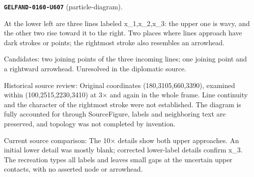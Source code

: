 \par\noindent\leavevmode{}\label{GELFAND-0160-U607}\label{GELFAND-P001483:particle-diagram}\textbf{\texttt{GELFAND-0160-U607}} (particle-diagram).\nopagebreak[4]\par
At the lower left are three lines labeled x\_1,x\_2,x\_3: the upper one is wavy, and the other two rise toward it to the right. Two places where lines approach have dark strokes or points; the rightmost stroke also resembles an arrowhead.\par
Candidates: two joining points of the three incoming lines; one joining point and a rightward arrowhead. Unresolved in the diplomatic source.\par
Historical source review: Original coordinates (180,3105,660,3390), examined within (100,2515,2230,3410) at 3× and again in the whole frame. Line continuity and the character of the rightmost stroke were not established. The diagram is fully accounted for through SourceFigure, labels and neighboring text are preserved, and topology was not completed by invention.\par
Current source comparison: The 10× details show both upper approaches. An initial lower detail was mostly blank; corrected lower-label details confirm x\_3. The recreation types all labels and leaves small gaps at the uncertain upper contacts, with no asserted node or arrowhead.\par\medskip
